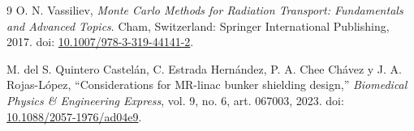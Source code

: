 \documentclass[11pt]{article}
\begin{document}
\begin{thebibliography}{9}
O. N. Vassiliev, \emph{Monte Carlo Methods for Radiation Transport: Fundamentals and Advanced Topics}. Cham, Switzerland: Springer International Publishing, 2017. doi: \href{https://doi.org/10.1007/978-3-319-44141-2}{10.1007/978-3-319-44141-2}.

M. del S. Quintero Castelán, C. Estrada Hernández, P. A. Chee Chávez y J. A. Rojas-López, ``Considerations for MR-linac bunker shielding design,'' \emph{Biomedical Physics \& Engineering Express}, vol. 9, no. 6, art. 067003, 2023. doi: \href{https://doi.org/10.1088/2057-1976/ad04e9}{10.1088/2057-1976/ad04e9}.
\end{thebibliography}
\end{document}
